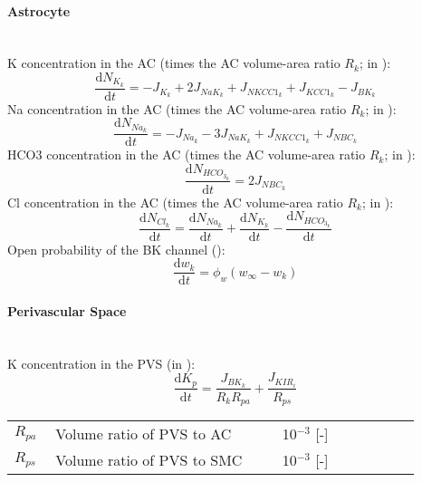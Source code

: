\paragraph{Astrocyte}~\\
%
\gls{K} concentration in the AC  (times the AC volume-area ratio $R_k$; in \uMm):
\begin{equation} \label{eq:KInt}
\dfrac{\mathrm{d}N_{K_k}}{\mathrm{d}t}=- J_{K_k} + 2 J_{NaK_{k}} + J_{NKCC1_{k}} +  J_{KCC1_{k}}
- J_{BK_k}  
\end{equation}
%
\gls{Na} concentration in the AC  (times the AC volume-area ratio $R_k$; in \uMm):
\begin{equation} \label{eq:NaInt}
\dfrac{\mathrm{d}N_{Na_k}}{\mathrm{d}t}=-J_{Na_k} - 3 J_{NaK_{k}} + J_{NKCC1_{k}} +  J_{NBC_{k}}
\end{equation}
%
\gls{HCO3} concentration in the AC  (times the AC volume-area ratio $R_k$; in \uMm):
\begin{equation} \label{eq:HCOInt}
\dfrac{\mathrm{d}N_{HCO_{3_k}}}{\mathrm{d}t}= 2 J_{NBC_{k}} 
\end{equation}
%
\gls{Cl} concentration in the AC  (times the AC volume-area ratio $R_k$; in \uMm):
\begin{equation} \label{eq:ClInt}
\dfrac{\mathrm{d}N_{Cl_k}}{\mathrm{d}t}= \dfrac{\mathrm{d}N_{Na_k}}{\mathrm{d}t} + \dfrac{\mathrm{d}N_{K_k}}{\mathrm{d}t} - \dfrac{\mathrm{d}N_{HCO_{3_{k}}}}{\mathrm{d}t}
\end{equation}
%
Open probability of the BK channel (\pers):
\begin{equation} \label{eq:dwkdt}
\frac{\mathrm{d}w_{k}}{\mathrm{d}t} = \phi_{w} \left(w_{\infty}-w_{k} \right) 
\end{equation}
%
\paragraph{Perivascular Space}~\\
\gls{K} concentration in the PVS  (in \uM):
\begin{equation} \label{eq:K_p}
\dfrac{\mathrm{d}K_{p}}{\mathrm{d}t}= \frac{J_{BK_k}}{R_k R_{pa}} + \frac{J_{KIR_i}}{ R_{ps}}
\end{equation}
%
\begin{table}[h!]
\centering
\begin{tabular}{ p{0.09\linewidth}  >{\footnotesize} p{0.5\linewidth}  >{\footnotesize} p{0.27\linewidth} >{\footnotesize} p{0.03\linewidth} }
\hline
$ R_{pa} $  & Volume ratio of PVS to AC & 10$^{-3}$ [-] & \cite{Nagelhus1999} \\
$ R_{ps} $  & Volume ratio of PVS to SMC & 10$^{-3}$ [-] & \cite{Nagelhus1999} \\
\hline
\end{tabular}
\end{table}
